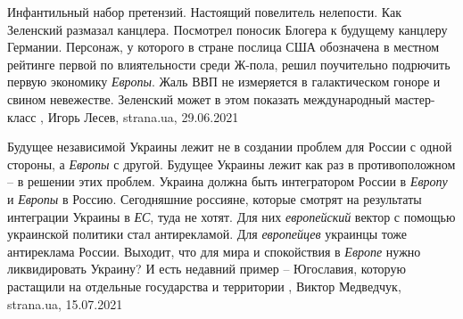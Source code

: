 Инфантильный набор претензий. Настоящий повелитель нелепости.  Как Зеленский
размазал канцлера.  Посмотрел поносик Блогера к будущему канцлеру Германии.
Персонаж, у которого в стране послица США обозначена в местном рейтинге первой
по влиятельности среди Ж-пола, решил поучительно подрючить первую экономику
\emph{Европы}. Жаль ВВП не измеряется в галактическом гоноре и свином
невежестве. Зеленский может в этом показать международный мастер-класс
, 
Игорь Лесев, strana.ua, 29.06.2021

Будущее независимой Украины лежит не в создании проблем для России с одной
стороны, а \emph{Европы} с другой. Будущее Украины лежит как раз в противоположном – в
решении этих проблем. Украина должна быть интегратором России в \emph{Европу} и \emph{Европы}
в Россию. Сегодняшние россияне, которые смотрят на результаты интеграции
Украины в \emph{ЕС}, туда не хотят. Для них \emph{европейский} вектор с помощью украинской
политики стал антирекламой.  Для \emph{европейцев} украинцы тоже антиреклама России.
Выходит, что для мира и спокойствия в \emph{Европе} нужно ликвидировать Украину? И
есть недавний пример – Югославия, которую растащили на отдельные государства и
территории
, 
Виктор Медведчук, strana.ua, 15.07.2021
